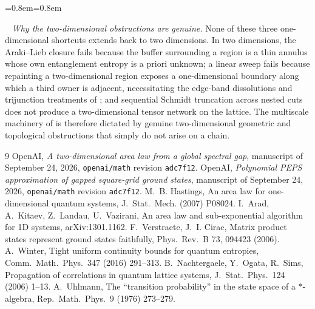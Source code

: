 \documentclass[aps,prx,reprint,superscriptaddress,floatfix,nofootinbib,longbibliography,amsmath,amssymb]{revtex4-2}
\theoremstyle{plain}
\theoremstyle{definition}
\newenvironment{inwords}{%
  \par\medskip\noindent
  \begin{list}{}{\leftmargin=0.8em\rightmargin=0.8em}
  \item\relax
  \noindent{\sffamily\bfseries\color{blue!40!black}In words.}\ \sffamily\small}{%
  \end{list}\par\medskip}
\begin{document}
\begin{inwords}
\emph{Why the two-dimensional obstructions are genuine.} None of these three
one-dimensional shortcuts extends back to two dimensions. In two dimensions,
the Araki--Lieb closure fails because the buffer surrounding a region is a
thin annulus whose own entanglement entropy is a priori unknown; a linear
sweep fails because repainting a two-dimensional region exposes a
one-dimensional boundary along which a third owner is adjacent, necessitating
the edge-band dissolutions and trijunction treatments of \cite{PP}; and sequential
Schmidt truncation across nested cuts does not produce a two-dimensional
tensor network on the lattice. The multiscale machinery of
\cite{AL,PP} is therefore dictated by genuine two-dimensional geometric and
topological obstructions that simply do not arise on a chain.
\end{inwords}

\begin{thebibliography}{9}
 OpenAI, \emph{A two-dimensional area law from a global spectral gap}, manuscript of September 24, 2026, \texttt{openai/math} revision \texttt{adc7f12}.
 OpenAI, \emph{Polynomial PEPS approximation of gapped square-grid ground states}, manuscript of September 24, 2026, \texttt{openai/math} revision \texttt{adc7f12}.
 M.~B. Hastings, An area law for one-dimensional quantum systems, J.~Stat.~Mech. (2007) P08024.
 I.~Arad, A.~Kitaev, Z.~Landau, U.~Vazirani, An area law and sub-exponential algorithm for 1D systems, arXiv:1301.1162.
 F.~Verstraete, J.~I. Cirac, Matrix product states represent ground states faithfully, Phys.~Rev.~B 73, 094423 (2006).
 A.~Winter, Tight uniform continuity bounds for quantum entropies, Comm.~Math.~Phys.~347 (2016) 291--313.
 B.~Nachtergaele, Y.~Ogata, R.~Sims, Propagation of correlations in quantum lattice systems, J.~Stat.~Phys.~124 (2006) 1--13.
 A.~Uhlmann, The ``transition probability'' in the state space of a $*$-algebra, Rep.~Math.~Phys.~9 (1976) 273--279.
\end{thebibliography}
\end{document}
